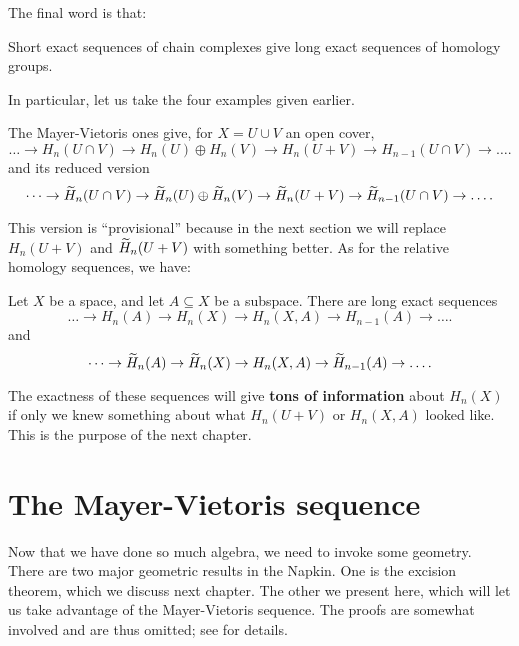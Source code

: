 The final word is that:
\begin{moral}
	Short exact sequences of chain complexes give
	long exact sequences of homology groups.
\end{moral}
In particular, let us take the four examples given earlier.
\begin{example}
	The Mayer-Vietoris ones give, for $X = U \cup V$ an open cover,
	\[ \dots \to H_n(U \cap V) \to H_n(U) \oplus H_n(V) \to H_n(U+V) \to H_{n-1}(U \cap V) \to \dots. \]
	and its reduced version
	\[ \dots \to \widetilde H_n(U \cap V) \to \widetilde H_n(U) \oplus \widetilde H_n(V)
	\to \widetilde H_n(U+V) \to \widetilde H_{n-1}(U \cap V) \to \dots. \]
\end{example}
This version is ``provisional'' because in the next section
we will replace $H_n(U+V)$ and $\widetilde H_n(U+V)$ with something better.
As for the relative homology sequences, we have:
\begin{theorem}
	\label{thm:long_exact_rel}
	Let $X$ be a space, and let $A \subseteq X$ be a subspace.
	There are long exact sequences
	\[ \dots \to H_n(A) \to H_n(X) \to H_n(X,A) \to H_{n-1}(A) \to \dots. \]
	and
	\[ \dots \to \widetilde H_n(A) \to \widetilde H_n(X) \to H_n(X,A) \to \widetilde H_{n-1}(A) \to \dots. \]
\end{theorem}
The exactness of these sequences will give \textbf{tons of information}
about $H_n(X)$ if only we knew something about what $H_n(U+V)$
or $H_n(X,A)$ looked like.  This is the purpose of the next chapter.

\section{The Mayer-Vietoris sequence}

Now that we have done so much algebra, we need to invoke some geometry.
There are two major geometric results in the Napkin.
One is the excision theorem, which we discuss next chapter.
The other we present here, which will let us take advantage of the
Mayer-Vietoris sequence.
The proofs are somewhat involved and are thus omitted;
see \cite{ref:hatcher} for details.

